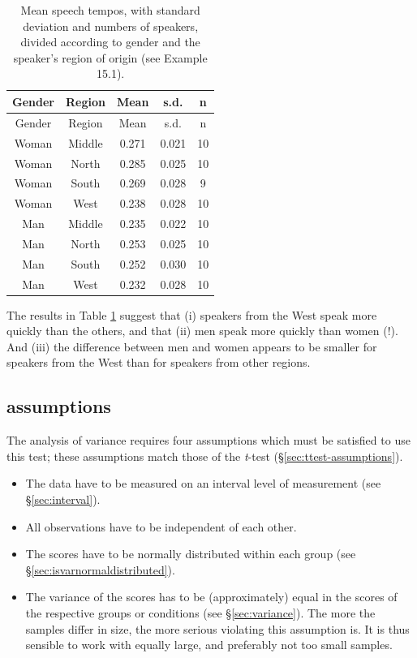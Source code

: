 \documentclass[
]{book}
\begin{document}
\begin{longtable}[]{@{}ccccc@{}}
\caption{\label{tab:sylduration2way} Mean speech tempos, with standard deviation and
numbers of speakers, divided according to gender and the speaker's region of origin
(see Example 15.1).}\tabularnewline
\toprule\noalign{}
Gender & Region & Mean & s.d. & n \\
\midrule\noalign{}
\endfirsthead
\toprule\noalign{}
Gender & Region & Mean & s.d. & n \\
\midrule\noalign{}
\endhead
\bottomrule\noalign{}
\endlastfoot
Woman & Middle & 0.271 & 0.021 & 10 \\
Woman & North & 0.285 & 0.025 & 10 \\
Woman & South & 0.269 & 0.028 & 9 \\
Woman & West & 0.238 & 0.028 & 10 \\
Man & Middle & 0.235 & 0.022 & 10 \\
Man & North & 0.253 & 0.025 & 10 \\
Man & South & 0.252 & 0.030 & 10 \\
Man & West & 0.232 & 0.028 & 10 \\
\end{longtable}

The results in Table \ref{tab:sylduration2way} suggest that (i) speakers from the
West speak more quickly than the others, and that (ii) men speak more quickly than
women (!). And (iii) the difference between men and women appears to be smaller
for speakers from the West than for speakers from other regions.

\hypertarget{assumptions}{%
\subsection{assumptions}\label{assumptions}}

The analysis of variance requires four assumptions which
must be satisfied to use this test; these assumptions match those of the
\emph{t}-test
(§\ref{sec:ttest-assumptions}).

\begin{itemize}
\item
  The data have to be measured on an interval level of measurement (see
  §\ref{sec:interval}).
\item
  All observations have to be independent of each other.
\item
  The scores have to be normally distributed within each group (see
  §\ref{sec:isvarnormaldistributed}).
\item
  The variance of the scores has to be (approximately) equal in
  the scores of the respective groups or conditions (see
  §\ref{sec:variance}).
  The more the samples differ in size, the more serious
  violating this assumption is. It is thus sensible to work with
  equally large, and preferably not too small samples.
\end{itemize}
\end{document}
